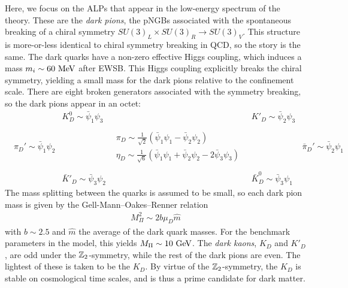 {Here, we focus on the ALPs that appear in the low-energy spectrum of the theory. These are the {\it dark pions}, the pNGBs associated with the spontaneous breaking of a chiral symmetry $SU(3)_L \times SU(3)_R \rightarrow SU(3)_V$. This structure is more-or-less identical to chiral symmetry breaking in QCD, so the story is the same. The dark quarks have a non-zero effective Higgs coupling, which induces a mass $m_i \sim 60~{\rm MeV}$ after EWSB. This Higgs coupling explicitly breaks the chiral symmetry, yielding a small mass for the dark pions relative to the confinement scale. There are eight broken generators associated with the symmetry breaking, so the dark pions appear in an octet:
\begin{align}
    &K^0_D \sim \bar{\psi}_1 \psi_3  &  & \ K'_D \sim \bar{\psi}_2 \psi_3 & \nonumber \\
    \nonumber\\
    \ \ \ \pi_D' \sim \bar{\psi}_1\psi_2  && \begin{matrix}\pi_D \sim \frac{1}{\sqrt{2}}(\bar{\psi}_1\psi_1 - \bar{\psi}_2 \psi_2)\\ 
    \eta_D \sim \frac{1}{\sqrt{6}}(\bar{\psi}_1 \psi_1 + \bar{\psi}_2{\psi}_2 - 2\bar{\psi}_3\psi_3)\end{matrix} && \bar{\pi}_D' \sim \bar{\psi}_2\psi_1 \ \ \ \\
   \nonumber\\
    & \bar{K}'_D \sim \bar{\psi}_3\psi_2 & & \ \bar{K}^0_D \sim \bar{\psi}_3\psi_1& \nonumber 
\end{align}
The mass splitting between the quarks is assumed to be small, so each dark pion mass is given by the Gell-Mann--Oakes--Renner relation \cite{Gell-Mann:1968hlm}
\begin{align}
    M_\Pi^2 \sim 2b\mu_D \hat{m}
\end{align}
with $b\sim 2.5$ and $\hat{m}$ the average of the dark quark masses. For the benchmark parameters in the model, this yields $M_\Pi \sim 10~{\rm GeV}$. The {\it dark kaons}, $K_D$ and $K'_D$, are odd under the ${\Bbb Z}_2$-symmetry, while the rest of the dark pions are even. The lightest of these is taken to be the $K_D$. By virtue of the ${\Bbb Z}_2$-symmetry, the $K_D$ is stable on cosmological time scales, and is thus a prime candidate for dark matter. 


}
